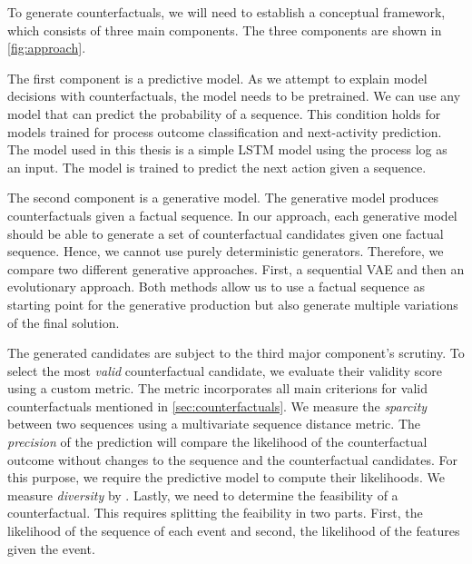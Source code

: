 \documentclass[./../../paper.tex]{subfiles}
\begin{document}
To generate counterfactuals, we will need to establish a conceptual framework, which consists of three main components. The three components are shown in \autoref{fig:approach}. 

The first component is a predictive model. As we attempt to explain model decisions with counterfactuals, the model needs to be pretrained. We can use any model that can predict the probability of a sequence. This condition holds for models trained for process outcome classification and next-activity prediction. The model used in this thesis is a simple LSTM model using the process log as an input. The model is trained to predict the next action given a sequence. 

The second component is a generative model. The generative model produces counterfactuals given a factual sequence. In our approach, each generative model should be able to generate a set of counterfactual candidates given one factual sequence. Hence, we cannot use purely deterministic generators. Therefore, we compare two different generative approaches. First, a sequential \gls{VAE} and then an evolutionary approach. Both methods allow us to use a factual sequence as starting point for the generative production but also generate multiple variations of the final solution. 

The generated candidates are subject to the third major component's scrutiny. To select the most \emph{valid} counterfactual candidate, we evaluate their validity score using a custom metric. The metric incorporates all main criterions for valid counterfactuals mentioned in \autoref{sec:counterfactuals}. We measure the \emph{sparcity} between two sequences using a multivariate sequence distance metric. The \emph{precision} of the prediction will compare the likelihood of the counterfactual outcome without changes to the sequence and the counterfactual candidates. For this purpose, we require the predictive model to compute their likelihoods. We measure \emph{diversity} by . Lastly, we need to determine the feasibility of a counterfactual. This requires splitting the feaibility in two parts. First, the likelihood of the sequence of each event and second, the likelihood of the features given the event.
\end{document}
